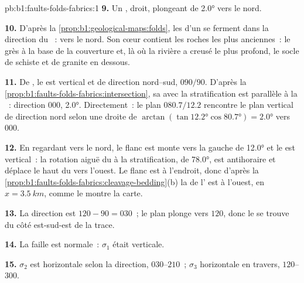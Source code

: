 \begin{solution}{pb:b1:faults-folds-fabrics:1}
\textbf{9.} Un , droit, plongeant de \ang{2.0} vers le nord.

\textbf{10.} D'après la \cref{prop:b1:geological-maps:folds}, les  d'un
 se ferment dans la direction du ~: vers le nord. Son cœur contient les
roches les plus anciennes~: le grès à la base de la couverture et, là où la rivière a
creusé le plus profond, le socle de schiste et de granite en dessous.

\textbf{11.} De , le  est vertical et de direction nord--sud,
$090/90$. D'après la \cref{prop:b1:faults-folds-fabrics:intersection}, sa
 avec la stratification est parallèle à la ~: direction
$000$,  \ang{2.0}. Directement~: le plan $080.7/12.2$ rencontre le plan
vertical de direction nord selon une droite de  $\arctan(\tan\ang{12.2}
\cos\ang{80.7}) = \ang{2.0}$ vers $000$.

\textbf{12.} En regardant vers le nord, le flanc est monte vers la gauche de \ang{12.0}
et le  est vertical~: la rotation aiguë du  à la
stratification, de \ang{78.0}, est antihoraire et déplace le haut du
 vers l'ouest. Le flanc est à l'endroit, donc d'après la
\cref{prop:b1:faults-folds-fabrics:cleavage-bedding}(b) la  de l' est
à l'ouest, en $x = \qty{3.5}{km}$, comme le montre la carte.

\textbf{13.} La direction est $120 - 90 = 030$~; le plan plonge vers $120$, donc
le  se trouve du côté est-sud-est de la trace.

\textbf{14.} La faille est normale~: $\sigma_1$ était verticale.

\textbf{15.} $\sigma_2$ est horizontale selon la direction, $030$--$210$~;
$\sigma_3$ horizontale en travers, $120$--$300$.


\end{solution}
